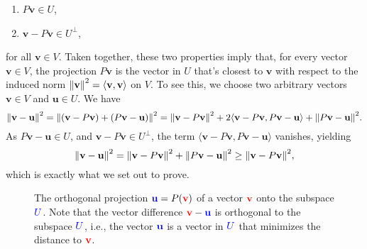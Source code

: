 \begin{enumerate}
    \item $P \mathbf{v} \in U$,

    \item $\mathbf{v} - P \mathbf{v} \in U^{\bot}$,
\end{enumerate}
for all $\mathbf{v} \in V$. Taken together, these two properties imply that, for every vector $\mathbf{v} \in V$, the projection $P \mathbf{v}$ is the vector in $U$ that's closest to $\mathbf{v}$ with respect to the induced norm $\norm{\mathbf{v}}^2 = \langle \mathbf{v}, \mathbf{v} \rangle$ on $V$. To see this, we choose two arbitrary vectors $\mathbf{v} \in V$ and $\mathbf{u} \in U$. We have
\[
    \norm{\mathbf{v} - \mathbf{u}}^2 = \norm{(\mathbf{v} - P \mathbf{v}) + (P \mathbf{v} - \mathbf{u})}^2 = \norm{\mathbf{v} - P \mathbf{v}}^2 + 2 \langle \mathbf{v} - P \mathbf{v}, P \mathbf{v} - \mathbf{u} \rangle + \norm{P \mathbf{v} - \mathbf{u}}^2.
\]
As $P \mathbf{v} - \mathbf{u} \in U$, and $\mathbf{v} - P \mathbf{v} \in U^{\bot}$, the term $\langle \mathbf{v} - P \mathbf{v}, P \mathbf{v} - \mathbf{u} \rangle$ vanishes, yielding
\[
    \norm{\mathbf{v} - \mathbf{u}}^2  = \norm{\mathbf{v} - P \mathbf{v}}^2 + \norm{P \mathbf{v} - \mathbf{u}}^2 \geq \norm{\mathbf{v} - P \mathbf{v}}^2,
\]
which is exactly what we set out to prove.

\begin{figure}
    \centering
    \caption{%
         The orthogonal projection ${\color{blue} \mathbf{u}} = P({\color{red} \mathbf{v}})$ of a vector ${\color{red} \mathbf{v}}$ onto the subspace ${\color{blue} U}$. Note that the vector difference ${\color{red} \mathbf{v}} - {\color{blue} \mathbf{u}}$ is orthogonal to the subspace ${\color{blue} U}$, i.e., the vector ${\color{blue} \mathbf{u}}$ is a vector in ${\color{blue} U}$ that minimizes the distance to ${\color{red} \mathbf{v}}$.
    }
    \label{fig: orthogonal projection}
\end{figure}

